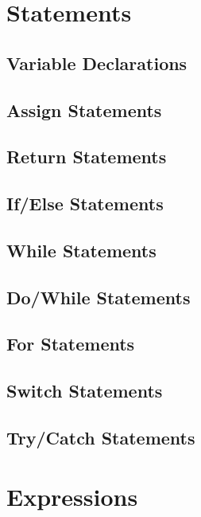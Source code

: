 \section{Statements}
\subsection{Variable Declarations}
\subsection{Assign Statements}
\subsection{Return Statements}
\subsection{If/Else Statements}
\subsection{While Statements}
\subsection{Do/While Statements}
\subsection{For Statements}
\subsection{Switch Statements}
\subsection{Try/Catch Statements}



\section{Expressions}
